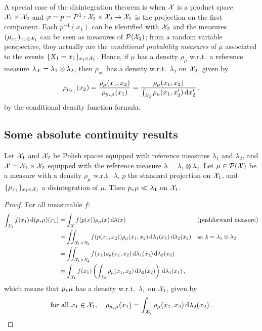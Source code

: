         \begin{remark}
            \label{rem:disintegration-product-space}
            A special case of the disintegration theorem is when $\mathcal{X}$ is a product space $\mathcal{X}_1\times\mathcal{X}_2$ and $\varphi=p=P^1:\mathcal{X}_1\times\mathcal{X}_2\to\mathcal{X}_1$ is the projection on the first component. Each $p^{-1}(x_1)$ can be identified with $\mathcal{X}_2$ and the measures $(\mu_{x_1})_{x_1\in\mathcal{X}_1}$ can be seen as measures of $\mathcal{P}(\mathcal{X}_2)$; from a random variable perspective, they actually are the \emph{conditional probability measures} of $\mu$ associated to the events $\{X_1=x_1\}_{x_1\in\mathcal{X}_1}$. Hence, if $\mu$ has a density $\rho_\mu$ w.r.t.~a reference measure $\lambda_{\mathcal{X}}=\lambda_1\otimes\lambda_2$, then $\mu_{x_1}$ has a density w.r.t.~$\lambda_2$ on $\mathcal{X}_2$, given by $$\rho_{\mu_{x_1}}(x_2)= \frac{\rho_{\mu}(x_1,x_2)}{\rho_{p_*\mu}(x_1)}=\frac{\rho_{\mu}(x_1,x_2)}{\int _{\mathcal{X}_2}\rho_{\mu}(x_1,x_2')\, \mathrm dx_2'}\,,$$
            by the conditional density function formula.
        \end{remark}

    \subsection{Some absolute continuity results}
    \begin{proposition}
        \label{lemma:density-push}
        Let $\mathcal{X}_1$ and $\mathcal{X}_2$ be Polish spaces equipped with reference measures $\lambda_1$ and $\lambda_2$, and $\mathcal{X}=\mathcal{X}_1\times\mathcal{X}_2$ equipped with the reference measure $\lambda=\lambda_1\otimes\lambda_2$. Let $\mu \in \mathcal{P}(\mathcal{X})$ be a measure with a density $\rho_{\mu}$ w.r.t.~$\lambda$, $p$ the standard projection on $\mathcal{X}_1$, and $\{ \mu_{x_1} \}_{x_1\in \mathcal{X}_1}$ a disintegration of $\mu$. Then $p_*\mu\ll\lambda_1$ on $\mathcal{X}_1$.
    \end{proposition}
    \begin{proof}
        For all measurable $f$:
        \begin{align*}
        \int_{\mathcal{X}_1} f(x_1)\, \mathrm d(p_*\mu)(x_1)&=\int_{\mathcal{X}} f(p(x))\rho_{\mu}(x)\, \mathrm d\lambda(x) &  & \text{(pushforward measure)} \\
                & =\iint_{\mathcal{X}_1\times \mathcal{X}_2} f(p(x_1,x_2))\rho_{\mu}(x_1,x_2)\, \mathrm d\lambda_1(x_1)\, \mathrm d\lambda_2(x_2) & & \text{as }\lambda=\lambda_1\otimes \lambda_2\\
                & =\iint_{\mathcal{X}_1\times \mathcal{X}_2} f(x_1)\rho_{\mu}(x_1,x_2)\, \mathrm d\lambda_1(x_1)\, \mathrm d\lambda_2(x_2) \\
                & =\int _{\mathcal{X}_1}f(x_1)\left( \int _{\mathcal{X}_2}\rho_{\mu}(x_1,x_2)\, \mathrm d\lambda_2(x_2) \right)\, \mathrm d\lambda_1(x_1)\,,
        \end{align*}
        which means that $p_*\mu$ has a density w.r.t.~$\lambda_1$ on $\mathcal{X}_1$, given by $$\text{for all }x_1\in\mathcal{X}_1,\quad\rho_{p_*\mu}(x_1)=\int _{\mathcal{X}_2}\rho_{\mu}(x_1,x_2)\, \mathrm d\lambda_2(x_2)\,.\qedhere$$
    \end{proof}



